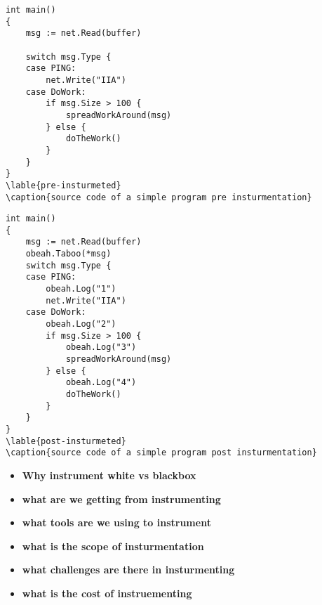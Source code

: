 \begin{lstlisting}
int main()
{
    msg := net.Read(buffer)
    
    switch msg.Type {
    case PING:
        net.Write("IIA")
    case DoWork:
        if msg.Size > 100 {
            spreadWorkAround(msg)
        } else {
            doTheWork()
        }
    }
}
\lable{pre-insturmeted}
\caption{source code of a simple program pre insturmentation}
\end{lstlisting}

\begin{lstlisting}
int main()
{
    msg := net.Read(buffer)
    obeah.Taboo(*msg)
    switch msg.Type {
    case PING:
        obeah.Log("1")
        net.Write("IIA")
    case DoWork:
        obeah.Log("2")
        if msg.Size > 100 {
            obeah.Log("3")
            spreadWorkAround(msg)
        } else {
            obeah.Log("4")
            doTheWork()
        }
    }
}
\lable{post-insturmeted}
\caption{source code of a simple program post insturmentation}
\end{lstlisting}


\begin{itemize}
    \item \textbf{Why instrument white vs blackbox}
    \item \textbf{what are we getting from instrumenting}
    \item \textbf{what tools are we using to instrument}
    \item \textbf{what is the scope of insturmentation}
    \item \textbf{what challenges are there in insturmenting}
    \item \textbf{what is the cost of instruementing}
\end{itemize}
